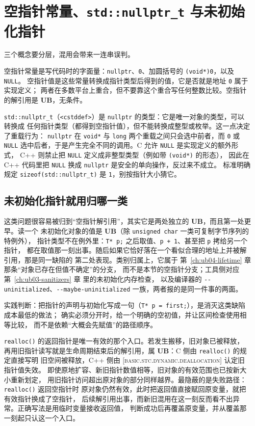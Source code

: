 \documentclass[12pt,a4paper,fontset=fandol]{ctexbook}
\newcommand{\Fn}[1]{\texttt{#1()}}
\newcommand{\Tp}[1]{\texttt{#1}}
\newcommand{\Bk}{\discretionary{}{}{}}
\newcommand{\Lang}[1]{\textsf{#1}}
\newcommand{\CL}{\Lang{C}}
\newcommand{\CPP}{\Lang{C++}}
\newcommand{\UB}{\textbf{\textsf{UB}}}
\newcommand{\Std}[1]{\textsc{[#1]}}
\newcommand{\Hdr}[1]{\texttt{<#1>}}
\newcommand{\Warn}[1]{\texttt{-\/-#1}}
\begin{document}
\section{空指针常量、\Tp{std::nullptr\_t} 与未初始化指针}\label{sec:ub05-null}

三个概念要分层，混用会带来一连串误判。

空指针常量是写代码时的字面量：\Tp{nullptr}、\Tp{0}、加圆括号的 \Tp{(void*)0}，以及 \Tp{NULL}。
空指针值是这些常量转换成指针类型后得到的值，它是否就是地址 \Tp{0} 属于实现定义；
两者在多数平台上重合，但不要靠这个重合写任何整数比较。空指针的解引用是 \UB{}，无条件。

\Tp{std::nullptr\_t}（\Hdr{cstddef}）是 \Tp{nullptr} 的类型：它是唯一对象的类型，可以转换成
任何指针类型（都得到空指针值），但不能转换成整型或枚举。这一点决定了重载行为：
\Tp{nullptr} 在 \Tp{void*} 与 \Tp{long} 两个重载之间只会选中前者，而 \Tp{0} 或 \Tp{NULL}
选中后者，于是产生完全不同的调用。\CL{} 允许 \Tp{NULL} 是实现定义的额外形式，
\CPP{} 则禁止把 \Tp{NULL} 定义成非整型类型（例如带 \Tp{(void*)} 的形态），
因此在 \CPP{} 代码里把 \Tp{NULL} 换成 \Tp{nullptr} 是安全的单向操作，反过来不成立。
标准明确规定 \Tp{sizeof(std::nullptr\_t)} 是 \Tp{1}，别按指针大小猜它。

\subsection{未初始化指针就用归哪一类}\label{sec:ub05-uninit}

这类问题很容易被归到“空指针解引用”，其实它是两处独立的 \UB{}，而且第一处更早。读一个
未初始化对象的值是 \UB{}（除 \Tp{unsigned char} 一类可复制字节序列的特例外），
指针类型不在例外里：\Tp{T* p;} 之后取值、\Tp{p + 1}、甚至把 \Tp{p} 拷给另一个指针，
都在取值那一刻出事。随后如果它恰好落在一个看似合理的地址上并被解引用，那是同一缺陷的
第二处表现。类别归属上，它属于 第~\ref{ch:ub04-lifetime} 章 那条“对象已存在但值不确定”的分支，
而不是本节的空指针分支；工具侧对应 第~\ref{ch:ub03-sanitizers} 章 里的未初始化内存检查，
以及编译器的 \Warn{uninitialized}、\Warn{maybe{\Bk}-uninitialized} 一族，两者报的是同一件事的两面。

实践判断：把指针的声明与初始化写成一句（\Tp{T* p = first;}），是消灭这类缺陷成本最低的做法；
确实必须分开时，给一个明确的空初值，并让区间检查使用相等比较，
而不是依赖“大概会先赋值”的路径顺序。

\begin{warning}[title={\Fn{realloc} 之后旧指针与新指针混用}]
\Fn{realloc} 的返回指针是唯一有效的那个入口。若发生搬移，旧对象已被释放，
再用旧指针读写就是生命周期结束后的解引用，属 \UB{}：\CL{} 侧由 \Fn{realloc} 的规定直接写明
旧空间被释放，\CPP{} 侧由 \Std{basic.stc.dynamic.deallocation} 认定旧指针值失效。
即使原地扩容、新旧指针数值相等，旧对象的有效范围也已按新大小重新划定，
用旧指针访问超出原对象的部分同样越界。最隐蔽的是失败路径：\Fn{realloc} 返回空指针时
原对象仍然有效，此时把返回值直接赋回原变量，就把有效指针换成了空指针，
后续解引用出事，而新旧混用在这一刻反而看不出异常。正确写法是用临时变量接收返回值，
判断成功后再覆盖原变量，并从覆盖那一刻起只认这一个入口。
\end{warning}
\end{document}
